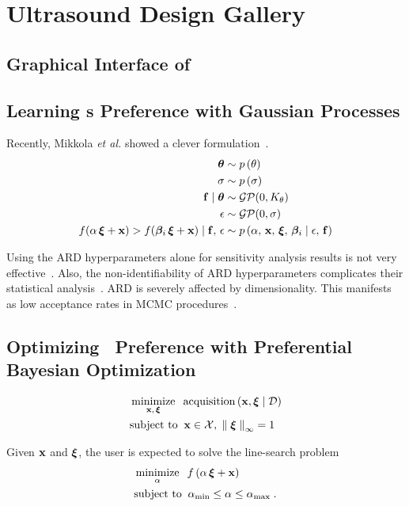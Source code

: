 
\section{Ultrasound Design Gallery}\label{section:method}

\subsection{Graphical Interface of \usdg}\label{section:ui}

\subsection{Learning {\user}s Preference with Gaussian Processes}\label{section:gp}

Recently, Mikkola \textit{et al.} showed a clever formulation~\cite{pmlr-v119-mikkola20a}.
\begin{align*}
\bm{\theta}                 &\sim p\,(\theta) \\
\sigma                  &\sim p\,(\sigma) \\
\mathbf{f} \mid \bm{\theta}        &\sim \mathcal{GP}(0, K_{\theta}) \\
\epsilon                &\sim \mathcal{GP}(0, \sigma) \\
  f(\alpha\,\bm{\xi} + \mathbf{x}) > f(\bm{\beta}_i\,\bm{\xi} + \mathbf{x}) \mid \mathbf{f},\, \epsilon
  &\sim p\,(\alpha,\, \mathbf{x},\,\bm{\xi},\,\bm{\beta}_i \mid \epsilon,\, \mathbf{f})  \\
\end{align*}

Using the ARD hyperparameters alone for sensitivity analysis results is not very effective~\cite{pmlr-v89-paananen19a}.
Also, the non-identifiability of ARD hyperparameters complicates their statistical analysis~\cite{zhang_inconsistent_2004a}.
ARD is severely affected by dimensionality.
This manifests as low acceptance rates in MCMC procedures~\cite{filippone_pseudomarginal_2014}.

\subsection{Optimizing \User~Preference with Preferential Bayesian Optimization}\label{section:bo}

\begin{align}
 &\operatorname*{minimize}_{\mathbf{x},\, \bm{\xi}}\;\; \mathrm{acquisition}\,(\mathbf{x}, \bm{\xi} \mid \mathcal{D}) \\
 &\text{subject to}\;\; \mathbf{x} \in \mathcal{X},\; {\parallel \bm{\xi} \parallel}_{\infty} = 1
\end{align}

Given \(\mathbf{x}\) and \(\bm{\xi}\), the user is expected to solve the line-search problem
\begin{align}
 &\operatorname*{minimize}_{ \alpha }\;\; f\,(\alpha\,\bm{\xi} + \mathbf{x}) \\
 &\text{subject to}\;\; \alpha_{\text{min}} \leq \alpha \leq \alpha_{\text{max}}\;.
\end{align}

